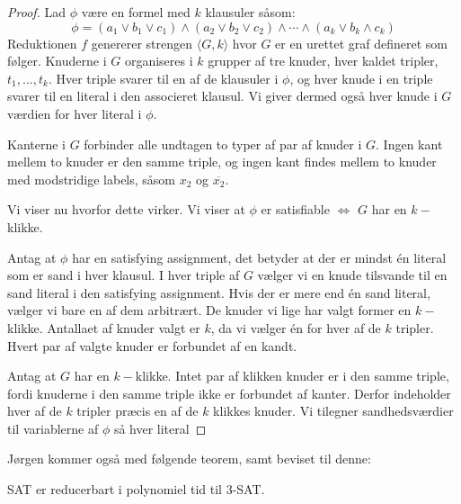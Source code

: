 \begin{proof}
	Lad $\phi$ være en formel med $k$ klausuler såsom:
	\begin{equation*}
		\phi = (a_{1} \lor b_{1} \lor c_{1}) \land (a_{2} \lor b_{2} \lor c_{2}) \land \cdots \land (a_{k} \lor b_{k} \land c_{k})
	\end{equation*}
	Reduktionen $f$ genererer strengen \(\langle G,k \rangle \) hvor $G$ er en urettet graf defineret som følger.
	Knuderne i $G$ organiseres i $k$ grupper af tre knuder, hver kaldet tripler, $t_{1}, \ldots, t_{k}$. Hver triple svarer til en af de klausuler i $\phi$, og hver knude i en triple svarer til en literal i den associeret klausul. Vi giver dermed også hver knude i $G$ værdien for hver literal i $\phi$.

	Kanterne i $G$ forbinder alle undtagen to typer af par af knuder i $G$. Ingen kant mellem to knuder er den samme triple, og ingen kant findes mellem to knuder med modstridige labels, såsom $x_{2}$ og $\overline{x_{2}}$.

	Vi viser nu hvorfor dette virker. Vi viser at $\phi$ er satisfiable $\iff$ $G$ har en $k-$klikke.

	Antag at $\phi$   har en satisfying assignment, det betyder at der er mindst én literal som er sand i hver klausul. I hver triple af $G$ vælger vi en knude tilsvande til en sand literal i den satisfying assignment. Hvis der er mere end én sand literal, vælger vi bare en af dem arbitrært. De knuder vi lige har valgt former en $k-$klikke. Antallaet af knuder valgt er $k$, da vi vælger én for hver af de $k$ tripler. Hvert par af valgte knuder er forbundet af en kandt.

	Antag at $G$ har en $k-$klikke. Intet par af klikken knuder er i den samme triple, fordi knuderne i den samme triple ikke er forbundet af kanter. Derfor indeholder hver af de $k$ tripler præcis en af de $k$ klikkes knuder. Vi tilegner sandhedsværdier til variablerne af $\phi$ så hver literal

\end{proof}

Jørgen kommer også med følgende teorem, samt beviset til denne:
\begin{theorem}
	SAT er reducerbart i polynomiel tid til 3-SAT.
\end{theorem}


